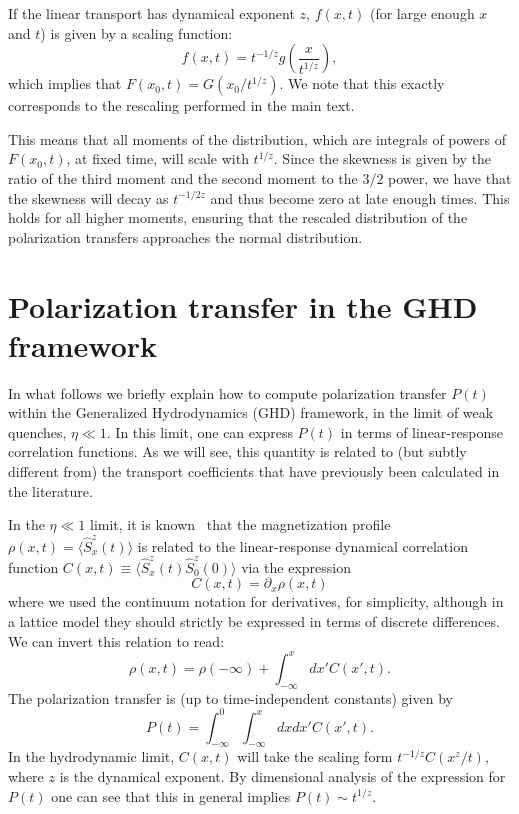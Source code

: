 \documentclass[
 reprint,
 superscriptaddress,
 amsmath,amssymb,
 aps,
 pra,
]{revtex4-2}
\begin{document}
If the linear transport has dynamical exponent $z$, $f(x,t)$ (for large enough $x$ and $t$) is given by a scaling function:
\begin{equation}
    f(x,t) = t^{-1/z} g\left( \frac{x}{t^{1/z}}\right),
\end{equation}
which implies that $F(x_0,t) = G(x_0/t^{1/z})$. We note that this exactly corresponds to the rescaling performed in the main text.

This means that all moments of the distribution, which are integrals of powers of $F(x_0,t)$, at fixed time, will scale with $t^{1/z}$. Since the skewness is given by the ratio of the third moment and the second moment to the $3/2$ power, we have that the skewness will decay as $t^{-1/2z}$ and thus become zero at late enough times.
This holds for all higher moments, ensuring that the rescaled distribution of the polarization transfers approaches the normal distribution.



\section{Polarization transfer in the GHD framework}

In what follows we briefly explain how to
%
compute polarization transfer $P(t)$ within the Generalized Hydrodynamics (GHD) framework, in the limit of weak quenches, $\eta \ll 1$. In this limit, one can express $P(t)$ in terms of linear-response correlation functions. As we will see, this quantity is related to (but subtly different from) the transport coefficients that have previously been calculated in the literature. 

In the $\eta \ll 1$ limit, it is known~\cite{Ljubotina2017} that the magnetization profile $\rho(x,t)=\langle \hat{S}_x^z(t)\rangle$ is related to the linear-response dynamical correlation function $C(x,t) \equiv \langle \hat{S}^z_x(t) \hat{S}^z_0(0) \rangle$ via the expression
%
\begin{equation}
C(x,t) = \partial_x \rho(x,t)
\end{equation}
%
where we used the continuum notation for derivatives, for simplicity, although in a lattice model they should strictly be expressed in terms of discrete differences. We can invert this relation to read:
%
\begin{equation}
\rho(x,t) = \rho(-\infty) + \int_{-\infty}^x dx' C(x',t).
\end{equation}
%
The polarization transfer is (up to time-independent constants) given by
%
\begin{equation}\label{pdef}
P(t) = \int_{-\infty}^0 \int_{-\infty}^x dx dx' C(x',t).
\end{equation}
%
In the hydrodynamic limit, $C(x,t)$ will take the scaling form $t^{-1/z} C(x^z/t)$, where $z$ is the dynamical exponent. By dimensional analysis of the expression for $P(t)$ one can see that this in general implies $P(t) \sim t^{1/z}$. 
\end{document}
